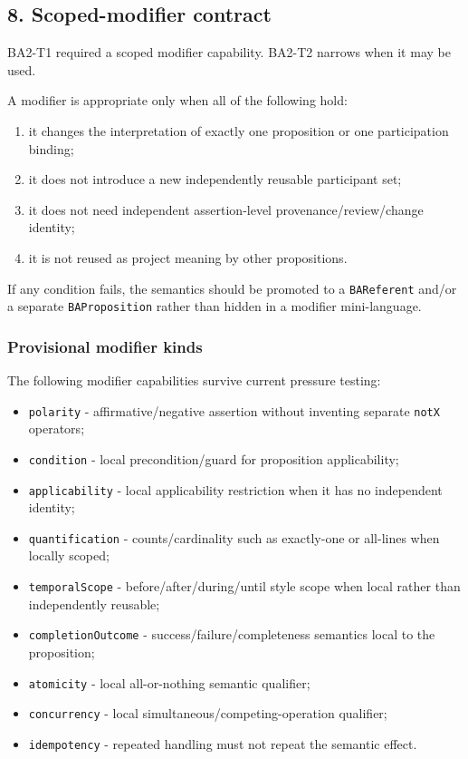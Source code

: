 \documentclass[
  10pt,
  letterpaper,
]{article}
\providecommand{\tightlist}{%
  \setlength{\itemsep}{0pt}\setlength{\parskip}{0pt}}
\begin{document}
\subsection{8. Scoped-modifier contract}\label{scoped-modifier-contract}

BA2-T1 required a scoped modifier capability. BA2-T2 narrows when it may
be used.

A modifier is appropriate only when all of the following hold:

\begin{enumerate}
\def\labelenumi{\arabic{enumi}.}
\tightlist
\item
  it changes the interpretation of exactly one proposition or one
  participation binding;
\item
  it does not introduce a new independently reusable participant set;
\item
  it does not need independent assertion-level provenance/review/change
  identity;
\item
  it is not reused as project meaning by other propositions.
\end{enumerate}

If any condition fails, the semantics should be promoted to a
\texttt{BAReferent} and/or a separate \texttt{BAProposition} rather than
hidden in a modifier mini-language.

\subsubsection{Provisional modifier
kinds}\label{provisional-modifier-kinds}

The following modifier capabilities survive current pressure testing:

\begin{itemize}
\tightlist
\item
  \texttt{polarity} - affirmative/negative assertion without inventing
  separate \texttt{notX} operators;
\item
  \texttt{condition} - local precondition/guard for proposition
  applicability;
\item
  \texttt{applicability} - local applicability restriction when it has
  no independent identity;
\item
  \texttt{quantification} - counts/cardinality such as exactly-one or
  all-lines when locally scoped;
\item
  \texttt{temporalScope} - before/after/during/until style scope when
  local rather than independently reusable;
\item
  \texttt{completionOutcome} - success/failure/completeness semantics
  local to the proposition;
\item
  \texttt{atomicity} - local all-or-nothing semantic qualifier;
\item
  \texttt{concurrency} - local simultaneous/competing-operation
  qualifier;
\item
  \texttt{idempotency} - repeated handling must not repeat the semantic
  effect.
\end{itemize}
\end{document}
